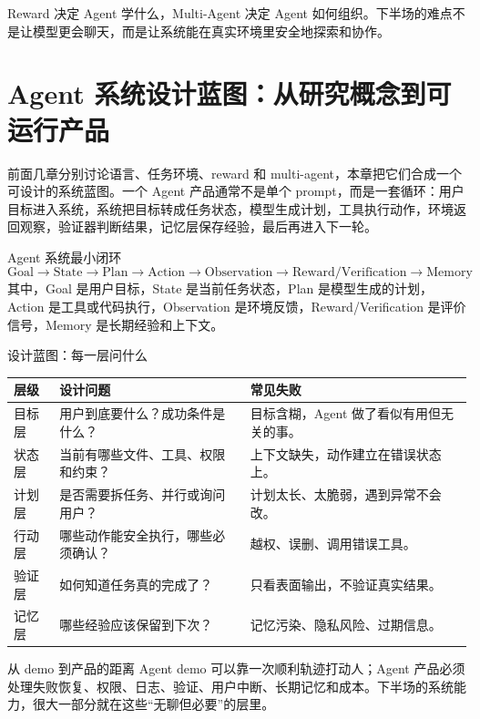 \documentclass[a4paper]{article}
\begin{document}
Reward 决定 Agent 学什么，Multi-Agent 决定 Agent 如何组织。下半场的难点不是让模型更会聊天，而是让系统能在真实环境里安全地探索和协作。

\section{Agent 系统设计蓝图：从研究概念到可运行产品}

前面几章分别讨论语言、任务环境、reward 和 multi-agent，本章把它们合成一个可设计的系统蓝图。一个 Agent 产品通常不是单个 prompt，而是一套循环：用户目标进入系统，系统把目标转成任务状态，模型生成计划，工具执行动作，环境返回观察，验证器判断结果，记忆层保存经验，最后再进入下一轮。

\begin{importantbox}{Agent 系统最小闭环}
\[
\text{Goal} \rightarrow \text{State} \rightarrow \text{Plan} \rightarrow \text{Action} \rightarrow \text{Observation} \rightarrow \text{Reward/Verification} \rightarrow \text{Memory}
\]
其中，Goal 是用户目标，State 是当前任务状态，Plan 是模型生成的计划，Action 是工具或代码执行，Observation 是环境反馈，Reward/Verification 是评价信号，Memory 是长期经验和上下文。
\end{importantbox}

\begin{knowledgebox}{设计蓝图：每一层问什么}
\begin{tabularx}{\textwidth}{p{}p{}X}
\toprule
层级 & 设计问题 & 常见失败 \\
\midrule
目标层 & 用户到底要什么？成功条件是什么？ & 目标含糊，Agent 做了看似有用但无关的事。 \\
状态层 & 当前有哪些文件、工具、权限和约束？ & 上下文缺失，动作建立在错误状态上。 \\
计划层 & 是否需要拆任务、并行或询问用户？ & 计划太长、太脆弱，遇到异常不会改。 \\
行动层 & 哪些动作能安全执行，哪些必须确认？ & 越权、误删、调用错误工具。 \\
验证层 & 如何知道任务真的完成了？ & 只看表面输出，不验证真实结果。 \\
记忆层 & 哪些经验应该保留到下次？ & 记忆污染、隐私风险、过期信息。 \\
\bottomrule
\end{tabularx}
\end{knowledgebox}

\begin{warningbox}{从 demo 到产品的距离}
Agent demo 可以靠一次顺利轨迹打动人；Agent 产品必须处理失败恢复、权限、日志、验证、用户中断、长期记忆和成本。下半场的系统能力，很大一部分就在这些“无聊但必要”的层里。
\end{warningbox}
\end{document}
